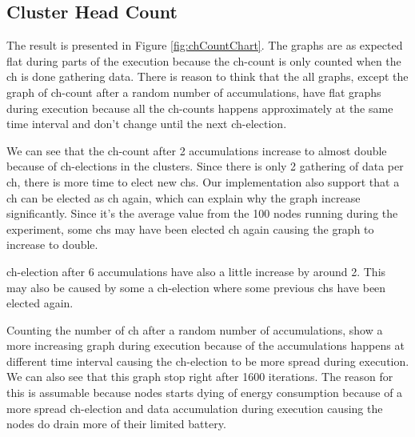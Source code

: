 \documentclass[USenglish]{uit-thesis}
\begin{document}
\newpage

\subsection{Cluster Head Count}

The result is presented in Figure \ref{fig:chCountChart}. The graphs are as expected flat during parts of the execution because the \gls{ch}-count is only counted when the \gls{ch} is done gathering data.
There is reason to think that the all graphs, except the graph of \gls{ch}-count after a random number of accumulations, have flat graphs during execution because all the \gls{ch}-counts happens approximately at the same time interval and don't change until the next \gls{ch}-election.

We can see that the \gls{ch}-count after 2 accumulations increase to almost double  because of \gls{ch}-elections in the clusters. Since there is only 2 gathering of data per \gls{ch}, there is more time to elect new \glspl{ch}. Our implementation also support that a \gls{ch} can be elected as \gls{ch} again, which can explain why the graph increase significantly. Since it's the average value from the 100 nodes running during the experiment, some \glspl{ch} may have been elected \gls{ch} again causing the graph to increase to double.


\gls{ch}-election after 6 accumulations have also a little increase by around 2. This may also be caused by some a \gls{ch}-election where some previous \glspl{ch} have been elected again. 


Counting the number of \gls{ch} after a random number of accumulations, show a more increasing graph during execution because of the accumulations happens at different time interval causing the \gls{ch}-election to be more spread during execution. We can also see that this graph stop right after 1600 iterations. The reason for this is assumable because nodes starts dying of energy consumption because of a more spread \gls{ch}-election and data accumulation during execution causing the nodes do drain more of their limited battery.
\end{document}
